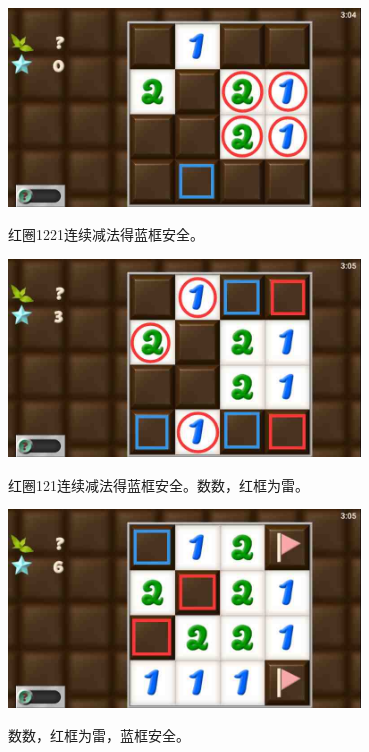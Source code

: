 \subsection{} %
\begin{center}
    \includegraphics[width=0.7\textwidth]{puzzlelow/51-1.jpg}
\end{center}
红圈1221连续减法得蓝框安全。
\begin{center}
    \includegraphics[width=0.7\textwidth]{puzzlelow/51-2.jpg}
\end{center}
红圈121连续减法得蓝框安全。数数，红框为雷。
\begin{center}
    \includegraphics[width=0.7\textwidth]{puzzlelow/51-3.jpg}
\end{center}
数数，红框为雷，蓝框安全。

